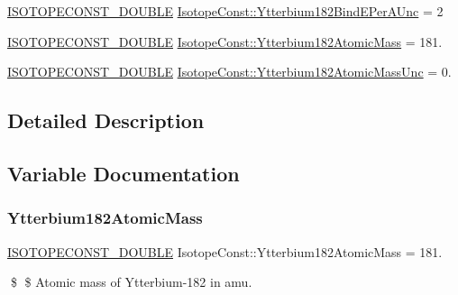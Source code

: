 \begin{DoxyCompactItemize}
\mbox{\hyperlink{group___isotope_const-_macros_ga8f45a7272ce02c0b4c65c44636ed719a}{I\+S\+O\+T\+O\+P\+E\+C\+O\+N\+S\+T\+\_\+\+D\+O\+U\+B\+LE}} \mbox{\hyperlink{group___isotope_const-_ytterbium-_yb182_ga3c9431cdf29d97e25bac1b345d9a091f}{Isotope\+Const\+::\+Ytterbium182\+Bind\+E\+Per\+A\+Unc}} = 2
\item 
\mbox{\hyperlink{group___isotope_const-_macros_ga8f45a7272ce02c0b4c65c44636ed719a}{I\+S\+O\+T\+O\+P\+E\+C\+O\+N\+S\+T\+\_\+\+D\+O\+U\+B\+LE}} \mbox{\hyperlink{group___isotope_const-_ytterbium-_yb182_ga8dfb283ea219526bc84f047879942c61}{Isotope\+Const\+::\+Ytterbium182\+Atomic\+Mass}} = 181.
\item 
\mbox{\hyperlink{group___isotope_const-_macros_ga8f45a7272ce02c0b4c65c44636ed719a}{I\+S\+O\+T\+O\+P\+E\+C\+O\+N\+S\+T\+\_\+\+D\+O\+U\+B\+LE}} \mbox{\hyperlink{group___isotope_const-_ytterbium-_yb182_ga983db5e7a306216939dfb925749cb05c}{Isotope\+Const\+::\+Ytterbium182\+Atomic\+Mass\+Unc}} = 0.
\end{DoxyCompactItemize}


\subsection{Detailed Description}


\subsection{Variable Documentation}
\mbox{\label{group___isotope_const-_ytterbium-_yb182_ga8dfb283ea219526bc84f047879942c61}} 
\subsubsection{\texorpdfstring{Ytterbium182\+Atomic\+Mass}{Ytterbium182AtomicMass}}
{\footnotesize\ttfamily \mbox{\hyperlink{group___isotope_const-_macros_ga8f45a7272ce02c0b4c65c44636ed719a}{I\+S\+O\+T\+O\+P\+E\+C\+O\+N\+S\+T\+\_\+\+D\+O\+U\+B\+LE}} Isotope\+Const\+::\+Ytterbium182\+Atomic\+Mass = 181.}

\$ \$ Atomic mass of Ytterbium-\/182 in amu. \mbox{\label{group___isotope_const-_ytterbium-_yb182_ga983db5e7a306216939dfb925749cb05c}} 
